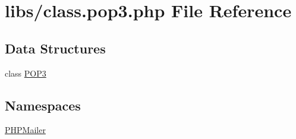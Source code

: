 \hypertarget{class_8pop3_8php}{}\section{libs/class.pop3.\+php File Reference}
\label{class_8pop3_8php}
\subsection*{Data Structures}
\begin{DoxyCompactItemize}
\item 
class \hyperlink{class_p_o_p3}{P\+O\+P3}
\end{DoxyCompactItemize}
\subsection*{Namespaces}
\begin{DoxyCompactItemize}
\item 
 \hyperlink{namespace_p_h_p_mailer}{P\+H\+P\+Mailer}
\end{DoxyCompactItemize}
